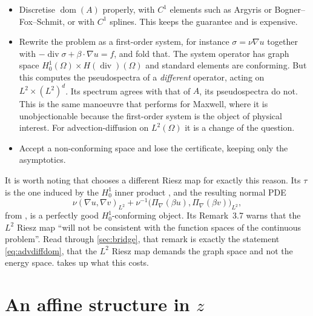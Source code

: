 \documentclass[11pt,a4paper]{article}
\theoremstyle{plain}
\DeclareMathOperator{\dom}{dom}
\DeclareMathOperator{\divg}{div}
\newcommand{\Hdiv}{H(\divg)}
\begin{document}
\begin{itemize}
  \item Discretise $\dom(A)$ properly, with $C^1$ elements such as Argyris or
        Bogner--Fox--Schmit, or with $C^1$ splines.  This keeps the guarantee
        and is expensive.
  \item Rewrite the problem as a first-order system, for instance $\sigma =
        \nu\nabla u$ together with $-\divg\sigma + \beta\cdot\nabla u = f$, and
        fold that.  The system operator has graph space $H^1_0(\Omega) \times
        \Hdiv(\Omega)$ and standard elements are conforming.  But this computes
        the pseudospectra of a \emph{different} operator, acting on $L^2 \times
        (L^2)^d$.  Its spectrum agrees with that of $A$, its pseudospectra do
        not.  This is the same manoeuvre that \cite[\S3.4.4]{Colbrook2026}
        performs for Maxwell, where it is unobjectionable because the
        first-order system is the object of physical interest.  For
        advection-diffusion on $L^2(\Omega)$ it is a change of the question.
  \item Accept a non-conforming space and lose the certificate, keeping only
        the asymptotics.
\end{itemize}

It is worth noting that \cite{LazzarinoNakatsukasaZerbinati2026} chooses a
different Riesz map for exactly this reason.  Its $\tau$ is the one induced by
the $H^1_0$ inner product \cite[Equation~(3.20)]{LazzarinoNakatsukasaZerbinati2026},
and the resulting normal PDE
\begin{equation}
  \label{eq:normalpde}
  \nu(\nabla u, \nabla v)_{L^2}
    + \nu^{-1}\bigl(\Pi_{\nabla}(\beta u), \Pi_{\nabla}(\beta v)\bigr)_{L^2},
\end{equation}
from \cite[Equation~(3.27)]{LazzarinoNakatsukasaZerbinati2026}, is a perfectly
good $H^1_0$-conforming object.  Its Remark~3.7 warns that the $L^2$ Riesz map
``will not be consistent with the function spaces of the continuous problem''.
Read through \cref{sec:bridge}, that remark is exactly the statement
\cref{eq:advdiffdom}, that the $L^2$ Riesz map demands the graph space and not
the energy space.   takes up what this costs.

\section{An affine structure in \texorpdfstring{$z$}{z}}
\label{sec:affine}
\end{document}
